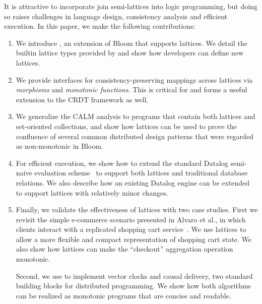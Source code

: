 It is attractive to incorporate join semi-lattices into logic programming,  but doing so raises challenges in language design, consistency analysis and efficient execution.  In this paper, we make the following contributions:
\begin{enumerate}

\item
  We introduce \lang, an extension of Bloom that supports lattices. We detail
  the builtin lattice types provided by \lang and show how developers can
  define new lattices.
  
\item 
  We provide interfaces for consistency-preserving mappings across lattices via
  \emph{morphisms} and \emph{monotonic functions}.  This is critical for \lang
  and forms a useful extension to the CRDT framework as well.

\item 
  We generalize the CALM analysis to programs that contain both lattices and
  set-oriented collections, and show how lattices can be used to prove the
  confluence of several common distributed design patterns that were regarded as
  non-monotonic in Bloom. %

\item
  For efficient execution, we show how to extend the standard Datalog semi-naive
  evaluation scheme~\cite{Balbin1987} to support both lattices and traditional
  database relations. We also describe how an existing Datalog engine can be
  extended to support lattices with relatively minor changes.

\item
  Finally, we validate the effectiveness of lattices with two case studies. First we
  revisit the simple e-commerce scenario presented in Alvaro et al., in which
  clients interact with a replicated shopping cart service~\cite{Alvaro2011}. We
  use lattices to allow a more flexible and compact representation of shopping
  cart state. We also show how lattices can make the ``checkout'' aggregation
  operation monotonic.

  Second, we use \lang to implement vector clocks and causal delivery, two
  standard building blocks for distributed programming. We show how both
  algorithms can be realized as monotonic \lang programs that are concise and
  readable.
\end{enumerate}
